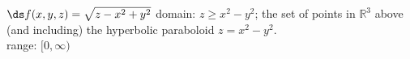 {$\ds f(x,y,z) = \sqrt{z-x^2+y^2}$
}
{domain: $z\geq x^2-y^2$; the set of points in $\mathbb{R}^3$ above (and including) the hyperbolic paraboloid $z=x^2-y^2$.\\
range: $[0,\infty)$
}